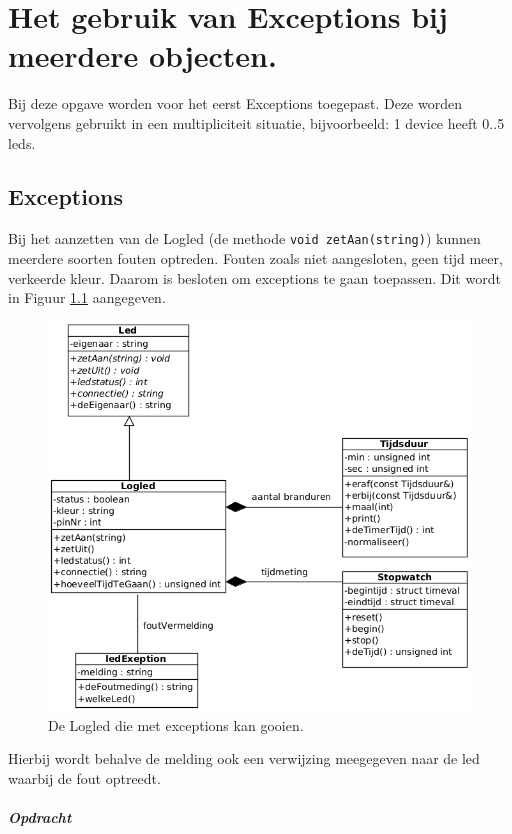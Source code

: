 \chapter{Het gebruik van Exceptions bij meerdere objecten.}

Bij deze opgave worden voor het eerst Exceptions toegepast. Deze worden vervolgens gebruikt in een multipliciteit situatie, bijvoorbeeld: 1 device heeft 0..5 leds.

\section{Exceptions} 
Bij het aanzetten van de Logled (de methode \texttt{void zetAan(string)}) kunnen meerdere soorten fouten optreden. Fouten zoals niet aangesloten, geen tijd meer, verkeerde kleur. Daarom is besloten om  exceptions te gaan toepassen. Dit wordt in Figuur \ref{fig:llExc} aangegeven.
\begin{figure}[h!]
	\captionsetup{justification=centering}
	\includegraphics[width=0.9 \linewidth]{figuren/llExcept}     
\centering
\caption{De Logled die met exceptions kan gooien.}
\label{fig:llExc}
\end{figure} 
Hierbij wordt behalve de melding ook een verwijzing meegegeven naar de led waarbij de fout optreedt.
\newpage
\paragraph{Opdracht}


